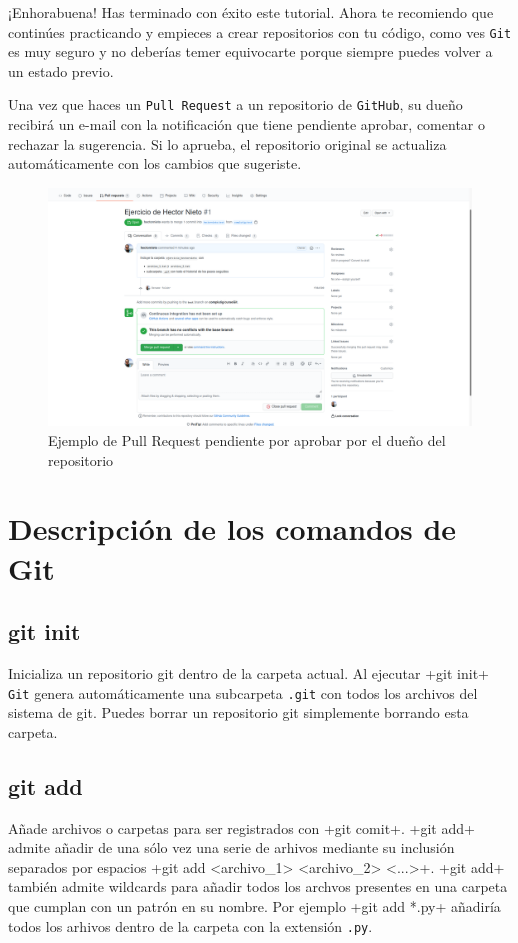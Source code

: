 \documentclass[a5paper, oneside,10pt]{article}
\begin{document}
    ¡Enhorabuena! Has terminado con éxito este tutorial. Ahora te recomiendo que continúes practicando y empieces a crear repositorios con tu código, como ves \verb+Git+ es muy seguro y no deberías temer equivocarte porque siempre puedes volver a un estado previo.
    
    Una vez que haces un \verb+Pull Request+ a un repositorio de \verb+GitHub+, su dueño recibirá un e-mail con la notificación que tiene pendiente aprobar, comentar o rechazar la sugerencia. Si lo aprueba, el repositorio original se actualiza automáticamente con los cambios que sugeriste.
    
     \begin{figure}[H]
      \hspace{-1cm}\includegraphics[width=1.6\columnwidth]{github_pending_pull_request}
      \caption{Ejemplo de Pull Request pendiente por aprobar por el dueño del repositorio}
     \end{figure}   
   

  \section{Descripción de los comandos de Git}
    \subsection{git init}
      Inicializa un repositorio git dentro de la carpeta actual. Al ejecutar \cverb+git init+ \verb+Git+ genera automáticamente una subcarpeta \verb+.git+ con todos los archivos del sistema de git. Puedes borrar un repositorio git simplemente borrando esta carpeta.
      
    \subsection{git add}
      Añade archivos o carpetas para ser registrados con \cverb+git comit+. \cverb+git add+ admite añadir de una sólo vez una serie de arhivos mediante su inclusión separados por espacios \cverb+git add <archivo_1> <archivo_2> <...>+. \cverb+git add+ también admite wildcards para añadir todos los archvos presentes en una carpeta que cumplan con un patrón en su nombre. Por ejemplo \cverb+git add *.py+ añadiría todos los arhivos dentro de la carpeta con la extensión \verb+.py+.
    
\end{document}
